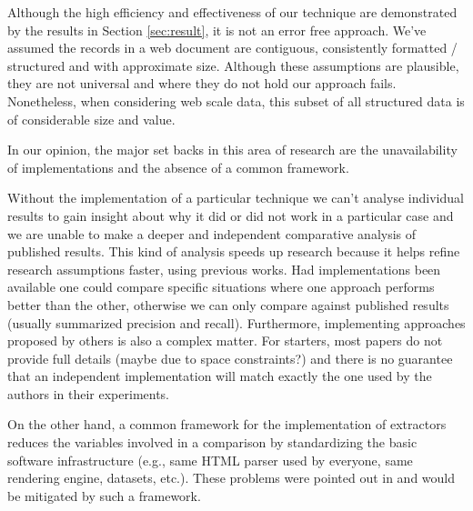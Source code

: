 Although the high efficiency and effectiveness of our technique are demonstrated
by the results in Section \ref{sec:result}, it is not an error free approach.
We've assumed the records in a web document are contiguous, consistently
formatted / structured and with approximate size. Although these assumptions are
plausible, they are not universal and where they do not hold our approach fails.
Nonetheless, when considering web scale data, this subset of all structured data
is of considerable size and value.

In our opinion, the major set backs in this area of research are the
unavailability of implementations and the absence of a common framework.

Without the implementation of a particular technique we can't analyse individual
results to gain insight about why it did or did not work in a particular case
and we are unable to make a deeper and independent comparative analysis of
published results. This kind of analysis speeds up research because it helps
refine research assumptions faster, using previous works. Had implementations
been available one could compare specific situations where one approach performs
better than the other, otherwise we can only compare against published results
(usually summarized precision and recall). Furthermore, implementing approaches
proposed by others is also a complex matter. For starters, most papers do not
provide full details (maybe due to space constraints?) and there is no guarantee
that an independent implementation will match exactly the one used by the
authors in their experiments.
 
On the other hand, a common framework for the implementation of extractors
reduces the variables involved in a comparison by standardizing the basic
software infrastructure (e.g., same HTML parser used by everyone, same rendering
engine, datasets, etc.). These problems were pointed out in
\cite{survey2013,survey2014} and would be mitigated by such a framework.
 
